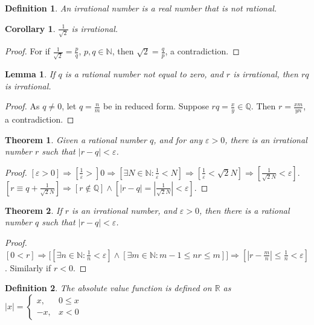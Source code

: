 \documentclass[oneside]{book}
\theoremstyle{mystyle}
\newtheorem{theorem}{Theorem}[section]
\newtheorem{definition}{Definition}[section]
\newtheorem{lemma}{Lemma}[section]
\newtheorem{corollary}{Corollary}[section]
\begin{document}
\begin{definition}
An irrational number is a real number that is not rational.
\end{definition}

\begin{corollary}
$\frac{1}{\sqrt{2}}$ is irrational. 
\end{corollary}
\begin{proof}
For if $\frac{1}{\sqrt{2}} = \frac{p}{q}$, $p,q\in \mathbb{N}$, then $\sqrt{2} = \frac{q}{p}$, a contradiction.
\end{proof}

\begin{lemma}
If $q$ is a rational number not equal to zero, and $r$ is irrational, then $rq$ is irrational.
\end{lemma}
\begin{proof}
As $q\ne 0$, let $q = \frac{n}{m}$ be in reduced form. Suppose $rq = \frac{x}{y}\in \mathbb{Q}$. Then $r=\frac{xm}{yn}$, a contradiction.
\end{proof}

\begin{theorem}
Given a rational number $q$, and for any $\varepsilon>0$, there is an irrational number $r$ such that $|r-q|<\varepsilon$.
\end{theorem}
\begin{proof}
$[\varepsilon>0]\Rightarrow [\frac{1}{\varepsilon}>]0\Rightarrow [\exists N\in \mathbb{N}:\frac{1}{\varepsilon}<N]\Rightarrow [\frac{1}{\varepsilon} < \sqrt{2}N]\Rightarrow [\frac{1}{\sqrt{2}N}< \varepsilon]$. $[r \equiv q+\frac{1}{\sqrt{2}{N}}]\Rightarrow [r\notin \mathbb{Q}]\land [|r-q| = |\frac{1}{\sqrt{2}N}| < \varepsilon]$.
\end{proof}

\begin{theorem}
If $r$ is an irrational number, and $\varepsilon>0$, then there is a rational number $q$ such that $|r-q|<\varepsilon$.
\end{theorem}
\begin{proof}
$[0<r]\Rightarrow \big[[\exists n\in \mathbb{N}: \frac{1}{n} < \varepsilon]\land[\exists m\in \mathbb{N}: m-1\leq nr \leq m]\big]\Rightarrow[|r-\frac{m}{n}| \leq \frac{1}{n} < \varepsilon]$. Similarly if $r<0$.
\end{proof}

\begin{definition}
The absolute value function is defined on $\mathbb{R}$ as $|x| = \begin{cases} x, & 0 \leq x \\ -x, & x<0 \end{cases}$
\end{definition}
\end{document}
